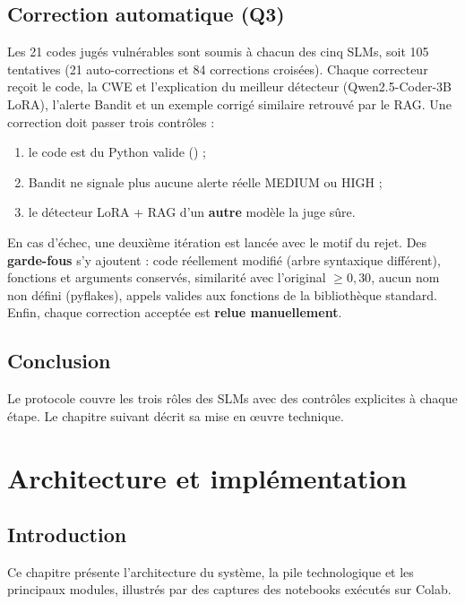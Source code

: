 \documentclass[11pt,a4paper,oneside]{report}
\newcommand{\code}[1]{\texttt{\detokenize{#1}}}
\newcommand{\chapintro}{\section*{Introduction}}
\newcommand{\chapconclusion}{\section*{Conclusion}}
\begin{document}
\section{Correction automatique (Q3)}
Les 21 codes jugés vulnérables sont soumis à chacun des cinq SLMs, soit 105 tentatives (21 auto-corrections et 84 corrections croisées). Chaque correcteur reçoit le code, la CWE et l'explication du meilleur détecteur (Qwen2.5-Coder-3B LoRA), l'alerte Bandit et un exemple corrigé similaire retrouvé par le RAG. Une correction doit passer trois contrôles :
\begin{enumerate}
  \item le code est du Python valide (\code{ast.parse}) ;
  \item Bandit ne signale plus aucune alerte réelle MEDIUM ou HIGH ;
  \item le détecteur LoRA + RAG d'un \textbf{autre} modèle la juge sûre.
\end{enumerate}
En cas d'échec, une deuxième itération est lancée avec le motif du rejet. Des \textbf{garde-fous} s'y ajoutent : code réellement modifié (arbre syntaxique différent), fonctions et arguments conservés, similarité avec l'original $\geq 0{,}30$, aucun nom non défini (pyflakes), appels valides aux fonctions de la bibliothèque standard. Enfin, chaque correction acceptée est \textbf{relue manuellement}.

\chapconclusion
Le protocole couvre les trois rôles des SLMs avec des contrôles explicites à chaque étape. Le chapitre suivant décrit sa mise en œuvre technique.

\chapter{Architecture et implémentation}\label{chap:implem}
\chapintro
Ce chapitre présente l'architecture du système, la pile technologique et les principaux modules, illustrés par des captures des notebooks exécutés sur Colab.
\end{document}
